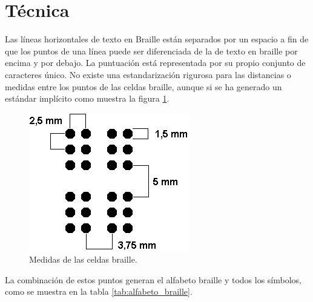 \section{T\'ecnica}
%
Las l\'ineas horizontales de texto en Braille est\'an separados por un espacio
a fin de que los puntos de una l\'inea puede ser diferenciada de la de texto
en braille por encima y por debajo. La puntuaci\'on est\'a representada por su
propio conjunto de caracteres \'unico. No existe una estandarizaci\'on
rigurosa para las distancias o medidas entre los puntos de las celdas braille,
aunque si se ha generado un est\'andar impl\'icito como muestra la figura
\ref{fig:distance_dots_braille}.


\begin{figure}[htp]
\centering
\includegraphics[scale=0.6]{./img/distance_dots_braille.png}
\caption{Medidas de las celdas braille.}
\label{fig:distance_dots_braille}
\end{figure}

La combinaci\'on de estos puntos generan el alfabeto braille y todos los
s\'imbolos, como se muestra en la tabla \ref{tab:alfabeto_braille}.


